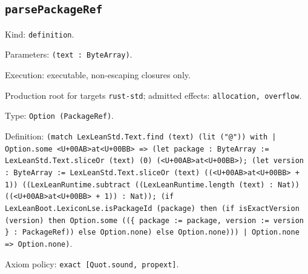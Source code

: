\documentclass[11pt]{article}
\begin{document}
\subsection*{\texttt{parsePackageRef}}
\noindent Kind: \texttt{definition}.\par
\noindent Parameters: \texttt{(text : ByteArray)}.\par
\noindent Execution: executable, non-escaping closures only.\par
\noindent Production root for targets \texttt{rust-std}; admitted effects: \texttt{allocation, overflow}.\par
\noindent Type: \texttt{Option (PackageRef)}.\par
\noindent Definition: \texttt{(match LexLeanStd.Text.find (text) (lit ("@")) with | Option.some <U+00AB>at<U+00BB> => (let package : ByteArray := LexLeanStd.Text.sliceOr (text) (0) (<U+00AB>at<U+00BB>); (let version : ByteArray := LexLeanStd.Text.sliceOr (text) ((<U+00AB>at<U+00BB> + 1)) ((LexLeanRuntime.subtract ((LexLeanRuntime.length (text) : Nat)) ((<U+00AB>at<U+00BB> + 1)) : Nat)); (if LexLeanBoot.LexiconLse.isPackageId (package) then (if isExactVersion (version) then Option.some ((\{ package := package, version := version \} : PackageRef)) else Option.none) else Option.none))) | Option.none => Option.none)}.\par
\noindent Axiom policy: \texttt{exact [Quot.sound, propext]}.\par
\end{document}
